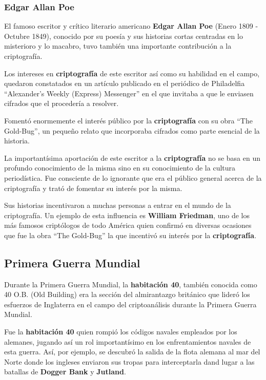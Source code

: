 \documentclass[nochap]{apuntesURJC}
\begin{document}
\subsubsection{Edgar Allan Poe}
El famoso escritor y crítico literario americano \textbf{Edgar Allan Poe} (Enero 1809 - Octubre 1849), conocido por su poesía y sus historias cortas centradas en lo misterioro y lo macabro, tuvo también una importante contribución a la criptografía.

Los intereses en \textbf{criptografía} de este escritor así como su habilidad en el campo, quedaron constatados en un artículo publicado en el periódico de Philadelfia ``Alexander's Weekly (Express) Messenger'' en el que invitaba a que le enviasen cifrados que el procedería a resolver.

Fomentó enormemente el interés público por la \textbf{criptografía} con su obra ``The Gold-Bug'', un pequeño relato que incorporaba cifrados como parte esencial de la historia.

La importantísima aportación de este escritor a la \textbf{criptografía} no se basa en un profundo conocimiento de la misma sino en su conocimiento de la cultura periodística. Fue consciente de lo ignorante que era el público general acerca de la criptografía y trató de fomentar su interés por la misma.

Sus historias incentivaron a muchas personas a entrar en el mundo de la criptografía. Un ejemplo de esta influencia es \textbf{William Friedman}, uno de los más famosos criptólogos de todo América quien confirmó en diversas ocasiones que fue la obra ``The Gold-Bug'' la que incentivó su interés por la \textbf{criptografía}.

\subsection{Primera Guerra Mundial}
Durante la Primera Guerra Mundial, la \textbf{habitación 40}, también conocida como 40 O.B. (Old Building) era la sección del almirantazgo británico que lideró los esfuerzos de Inglaterra en el campo del criptoanálisis durante la Primera Guerra Mundial.

Fue la \textbf{habitación 40} quien rompió los códigos navales empleados por los alemanes, jugando así un rol importantísimo en los enfrentamientos navales de esta guerra. Así, por ejemplo, se descubró la salida de la flota alemana al mar del Norte donde los ingleses enviaron sus tropas para interceptarla dand lugar a las batallas de \textbf{Dogger Bank} y \textbf{Jutland}.
\end{document}
